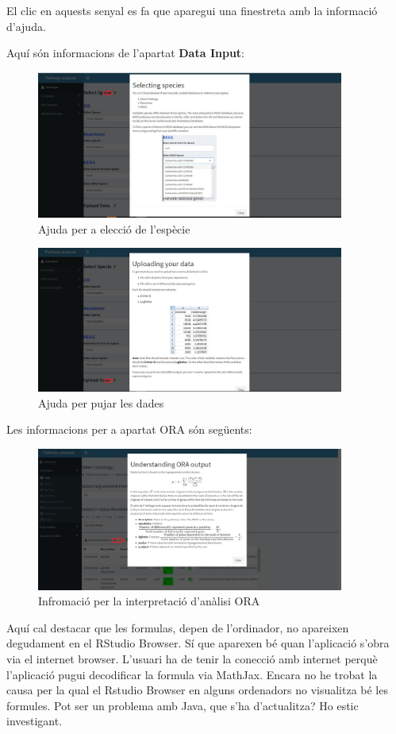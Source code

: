 \documentclass[]{article}
\begin{document}
El clic en aquests senyal es fa que aparegui una finestreta amb la informació d'ajuda.

Aquí són informacions de l'apartat \textbf{Data Input}:

\begin{figure}[H]
\centering
\includegraphics[width=0.9\textwidth]{Help_Specie.jpg} 
\caption{Ajuda per a elecció de l'espècie}
\end{figure}

\begin{figure}[H]
\centering
\includegraphics[width=0.9\textwidth]{Help_Upload_Data.jpg} 
\caption{Ajuda per pujar les dades}
\end{figure}

Les informacions per a apartat ORA són següents:

 \begin{figure}[H]
\centering
\includegraphics[width=0.9\textwidth]{Help_ORA_output.jpg} 
\caption{Infromació per la interpretació d'anàlisi ORA}
\end{figure}
Aquí cal destacar que les formulas, depen de l'ordinador, no apareixen degudament en el RStudio Browser. Sí que aparexen bé quan l'aplicació s'obra via el internet browser. L'usuari ha de tenir la conecció amb internet perquè l'aplicació pugui decodificar la formula via MathJax. Encara no he trobat la causa per la qual el Rstudio Browser en alguns ordenadors no visualitza bé les formules. Pot ser un problema amb Java, que s'ha d'actualitza? Ho estic investigant.
\end{document}

